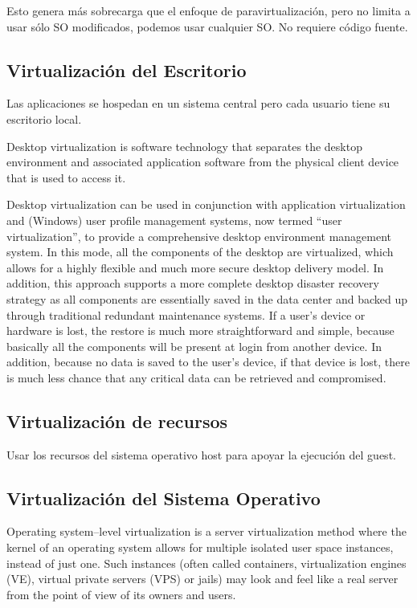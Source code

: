 \documentclass[a4paper, twoside]{article}
\begin{document}
Esto genera más sobrecarga que el enfoque de paravirtualización, pero no limita a usar sólo SO modificados, podemos usar cualquier SO. No requiere código fuente.

\subsection{Virtualización del Escritorio}
Las aplicaciones se hospedan en un sistema central pero cada usuario tiene su escritorio local.

Desktop virtualization is software technology that separates the desktop environment and associated application software from the physical client device that is used to access it.

Desktop virtualization can be used in conjunction with application virtualization and (Windows) user profile management systems, now termed ``user virtualization'', to provide a comprehensive desktop environment management system. In this mode, all the components of the desktop are virtualized, which allows for a highly flexible and much more secure desktop delivery model. In addition, this approach supports a more complete desktop disaster recovery strategy as all components are essentially saved in the data center and backed up through traditional redundant maintenance systems. If a user's device or hardware is lost, the restore is much more straightforward and simple, because basically all the components will be present at login from another device. In addition, because no data is saved to the user's device, if that device is lost, there is much less chance that any critical data can be retrieved and compromised. 

\subsection{Virtualización de recursos}
Usar los recursos del sistema operativo host para apoyar la ejecución del guest.

\subsection{Virtualización del Sistema Operativo}
Operating system–level virtualization is a server virtualization method where the kernel of an operating system allows for multiple isolated user space instances, instead of just one. Such instances (often called containers, virtualization engines (VE), virtual private servers (VPS) or jails) may look and feel like a real server from the point of view of its owners and users.
\end{document}

